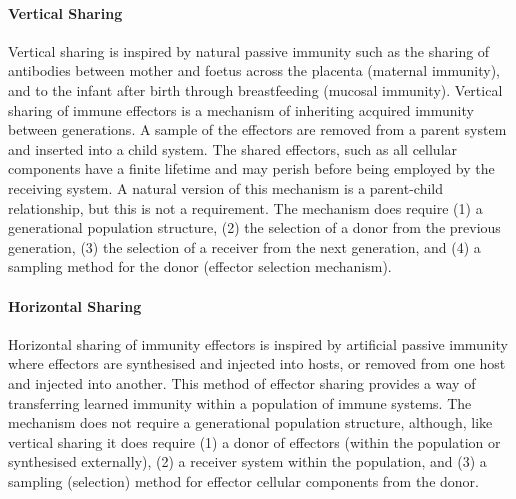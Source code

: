 \paragraph{Vertical Sharing}
Vertical sharing is inspired by natural passive immunity such as the sharing of antibodies between mother and foetus across the placenta (maternal immunity), and to the infant after birth through breastfeeding (mucosal immunity). Vertical sharing of immune effectors is a mechanism of inheriting acquired immunity between generations. A sample of the effectors are removed from a parent system and inserted into a child system. The shared effectors, such as all cellular components have a finite lifetime and may perish before being employed by the receiving system. A natural version of this mechanism is a parent-child relationship, but this is not a requirement. The mechanism does require (1) a generational population structure, (2) the selection of a donor from the previous generation, (3) the selection of a receiver from the next generation, and (4) a sampling method for the donor (effector selection mechanism).	
 
\paragraph{Horizontal Sharing}
Horizontal sharing of immunity effectors is inspired by artificial passive immunity where effectors are synthesised and injected into hosts, or removed from one host and injected into another. This method of effector sharing provides a way of transferring learned immunity within a population of immune systems. The mechanism does not require a generational population structure, although, like vertical sharing it does require (1) a donor of effectors (within the population or synthesised externally), (2) a receiver system within the population, and (3) a sampling (selection) method for effector cellular components from the donor.

%
%
